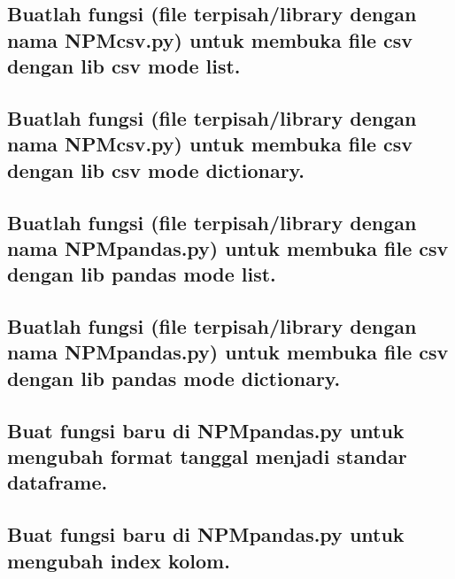 \subsection{Buatlah  fungsi  (file  terpisah/library  dengan  nama  NPMcsv.py)  untuk  membuka file csv dengan lib csv mode list.}


\subsection{Buatlah  fungsi  (file  terpisah/library  dengan  nama  NPMcsv.py)  untuk  membuka file csv dengan lib csv mode dictionary.}


\subsection{Buatlah fungsi (file terpisah/library dengan nama NPMpandas.py) untuk membuka file csv dengan lib pandas mode list.}


\subsection{Buatlah fungsi (file terpisah/library dengan nama NPMpandas.py) untuk membuka file csv dengan lib pandas mode dictionary.}


\subsection{Buat fungsi baru di NPMpandas.py untuk mengubah format tanggal menjadi standar dataframe.}


\subsection{Buat fungsi baru di NPMpandas.py untuk mengubah index kolom.}


